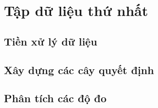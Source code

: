 \section{Tập dữ liệu thứ nhất}
\subsection{Tiền xử lý dữ liệu}
\subsection{Xây dựng các cây quyết định}
\subsection{Phân tích các độ đo}